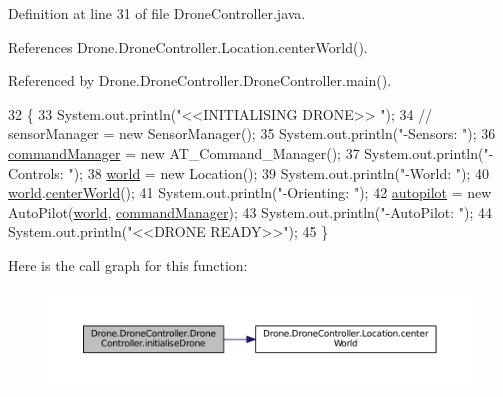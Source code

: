 Definition at line 31 of file Drone\+Controller.\+java.



References Drone.\+Drone\+Controller.\+Location.\+center\+World().



Referenced by Drone.\+Drone\+Controller.\+Drone\+Controller.\+main().


\begin{DoxyCode}
32     \{
33         System.out.println(\textcolor{stringliteral}{"<<INITIALISING DRONE>> "});
34 \textcolor{comment}{//      sensorManager = new SensorManager();}
35         System.out.println(\textcolor{stringliteral}{"-Sensors: "});
36         \hyperlink{class_drone_1_1_drone_controller_1_1_drone_controller_a0e5212312dbbb3e38165eb7827973575}{commandManager} = \textcolor{keyword}{new} AT\_Command\_Manager();
37         System.out.println(\textcolor{stringliteral}{"-Controls: "});
38         \hyperlink{class_drone_1_1_drone_controller_1_1_drone_controller_a486a9ca2889ba1e6281728d36e4b52f2}{world} = \textcolor{keyword}{new} Location();
39         System.out.println(\textcolor{stringliteral}{"-World: "});
40         \hyperlink{class_drone_1_1_drone_controller_1_1_drone_controller_a486a9ca2889ba1e6281728d36e4b52f2}{world}.\hyperlink{class_drone_1_1_drone_controller_1_1_location_ade44c8d7ef40f76ed148998673e18394}{centerWorld}();
41         System.out.println(\textcolor{stringliteral}{"-Orienting: "});
42         \hyperlink{class_drone_1_1_drone_controller_1_1_drone_controller_a8f81e6d1804ad7229a8f272c95d7a12a}{autopilot} = \textcolor{keyword}{new} AutoPilot(\hyperlink{class_drone_1_1_drone_controller_1_1_drone_controller_a486a9ca2889ba1e6281728d36e4b52f2}{world}, \hyperlink{class_drone_1_1_drone_controller_1_1_drone_controller_a0e5212312dbbb3e38165eb7827973575}{commandManager});
43         System.out.println(\textcolor{stringliteral}{"-AutoPilot: "});
44         System.out.println(\textcolor{stringliteral}{"<<DRONE READY>>"});
45     \}           
\end{DoxyCode}


Here is the call graph for this function\+:\nopagebreak
\begin{figure}[H]
\begin{center}
\leavevmode
\includegraphics[width=350pt]{class_drone_1_1_drone_controller_1_1_drone_controller_a83ead59dd788c4898761ab3a7b3f9099_cgraph}
\end{center}
\end{figure}




